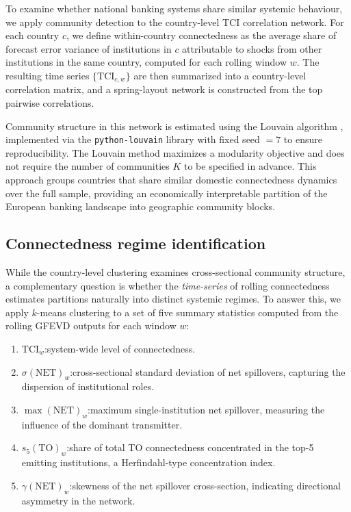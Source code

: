 To examine whether national banking systems share similar systemic behaviour, we apply
community detection to the country-level TCI correlation network. For each country $c$,
we define within-country connectedness as the average share of forecast error variance
of institutions in $c$ attributable to shocks from other institutions in the same
country, computed for each rolling window $w$. The resulting time series
$\{\mathrm{TCI}_{c,w}\}$ are then summarized into a country-level correlation matrix,
and a spring-layout network is constructed from the top pairwise correlations.

Community structure in this network is estimated using the Louvain algorithm
\citep{Blondel2008}, implemented via the \texttt{python-louvain} library with fixed seed
$= 7$ to ensure reproducibility. The Louvain method maximizes a modularity objective and
does not require the number of communities $K$ to be specified in advance. This approach
groups countries that share similar domestic connectedness dynamics over the full sample,
providing an economically interpretable partition of the European banking landscape into
geographic community blocks.

\subsection{Connectedness regime identification}\label{subsec:regimes}

While the country-level clustering examines cross-sectional community structure, a
complementary question is whether the \emph{time-series} of rolling connectedness
estimates partitions naturally into distinct systemic regimes. To answer this, we apply
$k$-means clustering to a set of five summary statistics computed from the rolling GFEVD
outputs for each window $w$:

\begin{enumerate}
  \item $\mathrm{TCI}_w$:system-wide level of connectedness.
  \item $\sigma(\mathrm{NET})_w$:cross-sectional standard deviation of net spillovers,
    capturing the dispersion of institutional roles.
  \item $\max(\mathrm{NET})_w$:maximum single-institution net spillover,
    measuring the influence of the dominant transmitter.
  \item $s_5(\mathrm{TO})_w$:share of total TO connectedness concentrated in the
    top-5 emitting institutions, a Herfindahl-type concentration index.
  \item $\gamma(\mathrm{NET})_w$:skewness of the net spillover cross-section,
    indicating directional asymmetry in the network.
\end{enumerate}

